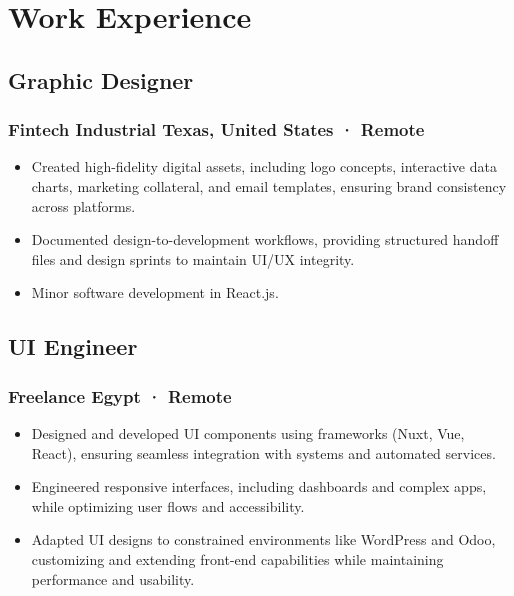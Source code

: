 \section*{Work Experience}
%
%
%
%
%
%
%
%
\subsection*{
	Graphic Designer
	\hspace*{\fill}
}
\subsubsection*{
	Fintech Industrial 
	\hspace*{\fill}
	\smallFormat Texas, United States · Remote
}
\begin{itemize}
	\item Created high-fidelity digital assets, including logo concepts, interactive data charts, marketing collateral, and email templates, ensuring brand consistency across platforms.
	\item Documented design-to-development workflows, providing structured handoff files and design sprints to maintain UI/UX integrity.
	\item Minor software development in React.js.
\end{itemize}
%
%
%
%
\subsection*{
	UI Engineer
	\hspace*{\fill}
}
\subsubsection*{
	Freelance
	\hspace*{\fill}
	\smallFormat Egypt · Remote
}
\begin{itemize}
	\item Designed and developed UI components using frameworks (Nuxt, Vue, React), ensuring seamless integration with systems and automated services.
	\item Engineered responsive interfaces, including dashboards and complex apps, while optimizing user flows and accessibility.
	\item Adapted UI designs to constrained environments like WordPress and Odoo, customizing and extending front-end capabilities while maintaining performance and usability.
\end{itemize}